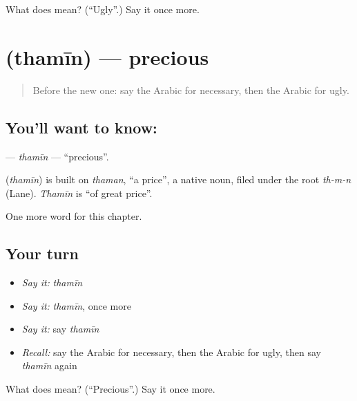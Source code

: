 \begin{tcolorbox}[breakable,colback=teal!4,colframe=teal!35!black,title={Before you move on}]
What does  mean? (\textquotedblleft{}Ugly\textquotedblright{}.) Say it once more.
\end{tcolorbox}
\section[\texorpdfstring{\ar{ثمين} (thamīn)}{ثمين (thamīn)}]{ (thamīn) — precious}

\label{lesson:AR-C155-thamin}



\begin{quote}
Before the new one: say the Arabic for necessary, then the Arabic for ugly.
\end{quote}

\subsection*{You'll want to know: }
\textbf{} — \emph{thamīn} — \textquotedblleft{}precious\textquotedblright{}.

\begin{cousinweb}
\textbf{} (\emph{thamīn}) is built on \emph{thaman}, \textquotedblleft{}a price\textquotedblright{}, a native noun, filed under the root \emph{th-m-n} (Lane). \emph{Thamīn} is \textquotedblleft{}of great price\textquotedblright{}.
\end{cousinweb}

\begin{grammarlens}[title={What you've built}]
One more word for this chapter.
\end{grammarlens}

\subsection*{Your turn}
\begin{itemize}
\raggedright
  \item \emph{Say it:} \emph{thamīn}
  \item \emph{Say it:} \emph{thamīn}, once more
  \item \emph{Say it:} say \emph{thamīn}
  \item \emph{Recall:} say the Arabic for necessary, then the Arabic for ugly, then say \emph{thamīn} again
\end{itemize}

\begin{tcolorbox}[breakable,colback=teal!4,colframe=teal!35!black,title={Before you move on}]
What does  mean? (\textquotedblleft{}Precious\textquotedblright{}.) Say it once more.
\end{tcolorbox}
